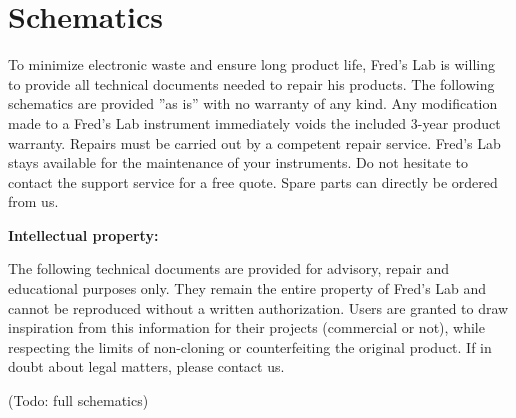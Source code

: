 \documentclass{scrartcl}
\begin{document}
\pagebreak


\section{Schematics}

To minimize electronic waste and ensure long product life, Fred’s Lab is willing to provide all technical documents needed to repair his products. The following schematics are provided ”as is” with no warranty of any kind. Any modification made to a Fred’s Lab instrument immediately voids the included 3-year product warranty. Repairs must be carried out by a competent repair service. Fred’s Lab stays available for the maintenance of your instruments. Do not hesitate to contact the support service for a free quote. Spare parts can directly be ordered from us.

\textbf{Intellectual property:}

The following technical documents are provided for advisory, repair and educational purposes only. They remain the entire property of Fred's Lab and cannot be reproduced without a written authorization. Users are granted to draw inspiration from this information for their projects (commercial or not), while respecting the limits of non-cloning or counterfeiting the original product. If in doubt about legal matters, please contact us.

\begin{center}
    (Todo: full schematics)
\end{center}
\end{document}
